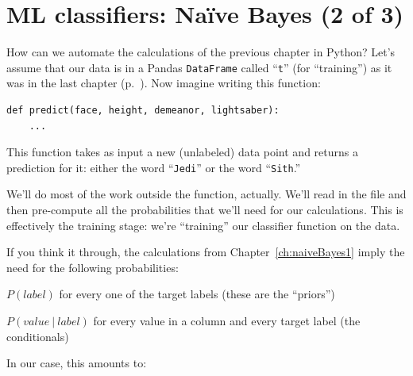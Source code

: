 
\chapter[Na\"{i}ve Bayes (2 of 3)]
{\LARGE ML classifiers: Na\"{i}ve Bayes (2 of 3)}
\label{ch:naiveBayes2}

How can we automate the calculations of the previous chapter in Python? Let's
assume that our data is in a Pandas \texttt{DataFrame} called ``\texttt{t}''
(for ``training'') as it was in the last chapter (p.~\pageref{jediTraining}).
Now imagine writing this function:


\begin{Verbatim}[fontsize=\small,samepage=true,frame=single,framesep=3mm]
def predict(face, height, demeanor, lightsaber):
    ...
\end{Verbatim}


This function takes as input a new (unlabeled) data point and returns a
prediction for it: either the word ``\texttt{Jedi}'' or the word
``\texttt{Sith}.''


We'll do most of the work outside the function, actually. We'll read in the
file and then pre-compute all the probabilities that we'll need for our
calculations. This is effectively the training stage: we're ``training'' our
classifier function on the data.

If you think it through, the calculations from Chapter~\ref{ch:naiveBayes1}
imply the need for the following probabilities:


\begin{compactitem}
\item $P(label)$ for every one of the target labels (these are the ``priors'')
\item $P(value\ |\ label)$ for every value in a column and every target label
(the conditionals)
\end{compactitem}

In our case, this amounts to:

